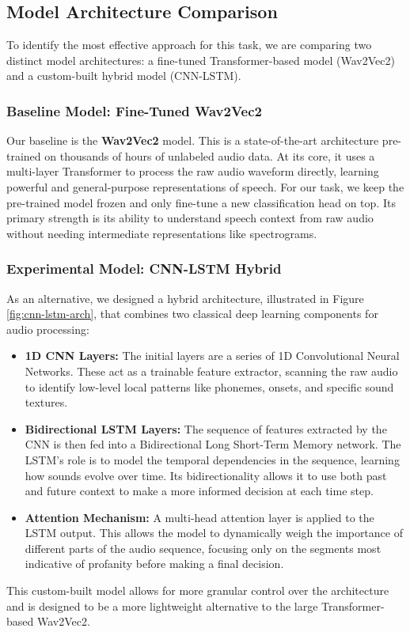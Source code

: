 \documentclass{article}
\begin{document}
\subsection{Model Architecture Comparison}

To identify the most effective approach for this task, we are comparing two distinct model architectures: a fine-tuned Transformer-based model (Wav2Vec2) and a custom-built hybrid model (CNN-LSTM).

\subsubsection{Baseline Model: Fine-Tuned Wav2Vec2}
Our baseline is the \textbf{Wav2Vec2} model. This is a state-of-the-art architecture pre-trained on thousands of hours of unlabeled audio data. At its core, it uses a multi-layer Transformer to process the raw audio waveform directly, learning powerful and general-purpose representations of speech. For our task, we keep the pre-trained model frozen and only fine-tune a new classification head on top. Its primary strength is its ability to understand speech context from raw audio without needing intermediate representations like spectrograms.

\subsubsection{Experimental Model: CNN-LSTM Hybrid}
As an alternative, we designed a hybrid architecture, illustrated in Figure \ref{fig:cnn-lstm-arch}, that combines two classical deep learning components for audio processing:
\begin{itemize}
    \item \textbf{1D CNN Layers:} The initial layers are a series of 1D Convolutional Neural Networks. These act as a trainable feature extractor, scanning the raw audio to identify low-level local patterns like phonemes, onsets, and specific sound textures.
    \item \textbf{Bidirectional LSTM Layers:} The sequence of features extracted by the CNN is then fed into a Bidirectional Long Short-Term Memory network. The LSTM's role is to model the temporal dependencies in the sequence, learning how sounds evolve over time. Its bidirectionality allows it to use both past and future context to make a more informed decision at each time step.
    \item \textbf{Attention Mechanism:} A multi-head attention layer is applied to the LSTM output. This allows the model to dynamically weigh the importance of different parts of the audio sequence, focusing only on the segments most indicative of profanity before making a final decision.
\end{itemize}
This custom-built model allows for more granular control over the architecture and is designed to be a more lightweight alternative to the large Transformer-based Wav2Vec2.
\end{document}
